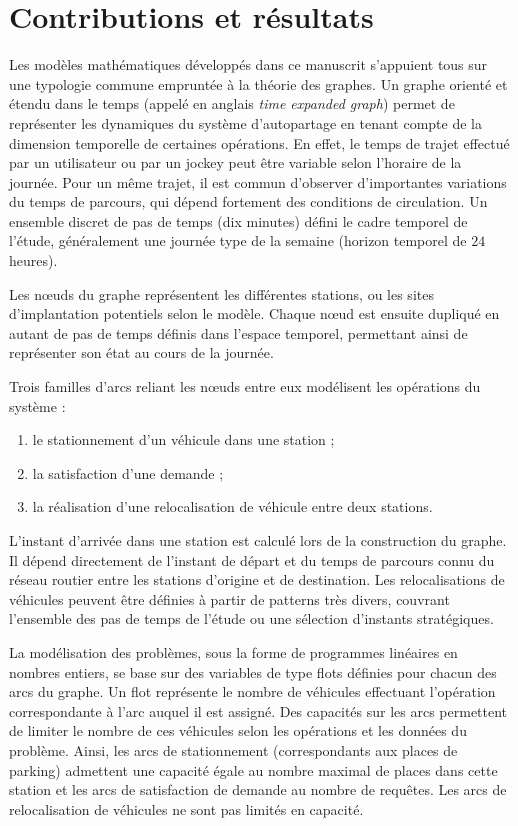 \newpage
\section*{Contributions et résultats}
Les modèles mathématiques développés dans ce manuscrit s'appuient tous sur une typologie commune empruntée à la théorie des graphes.
Un graphe orienté et étendu dans le temps (appelé en anglais \emph{time expanded graph}) permet de représenter les dynamiques du système d'autopartage en tenant compte de la dimension temporelle de certaines opérations.
En effet, le temps de trajet effectué par un utilisateur ou par un jockey peut être variable selon l'horaire de la journée.
Pour un même trajet, il est commun d'observer d'importantes variations du temps de parcours, qui dépend fortement des conditions de circulation.
Un ensemble discret de pas de temps (\eg dix minutes) défini le cadre temporel de l'étude, généralement une journée type de la semaine (horizon temporel de $24$ heures).

\medskip
Les nœuds du graphe représentent les différentes stations, ou les sites d'implantation potentiels selon le modèle.
Chaque nœud est ensuite dupliqué en autant de pas de temps définis dans l'espace temporel, permettant ainsi de représenter son état au cours de la journée.

Trois familles d'arcs reliant les nœuds entre eux modélisent les opérations du système :
\begin{enumerate}
\item le stationnement d'un véhicule dans une station ;
\item la satisfaction d'une demande ;
\item la réalisation d'une relocalisation de véhicule entre deux stations.
\end{enumerate}

\medskip
L'instant d'arrivée dans une station est calculé lors de la construction du graphe.
Il dépend directement de l'instant de départ et du temps de parcours connu du réseau routier entre les stations d'origine et de destination.
Les relocalisations de véhicules peuvent être définies à partir de patterns très divers, couvrant l'ensemble des pas de temps de l'étude ou une sélection d'instants stratégiques.

\medskip
La modélisation des problèmes, sous la forme de programmes linéaires en nombres entiers, se base sur des variables de type flots définies pour chacun des arcs du graphe.
Un flot représente le nombre de véhicules effectuant l'opération correspondante à l'arc auquel il est assigné.
Des capacités sur les arcs permettent de limiter le nombre de ces véhicules selon les opérations et les données du problème.
Ainsi, les arcs de stationnement (correspondants aux places de parking) admettent une capacité égale au nombre maximal de places  dans cette station et les arcs de satisfaction de demande au nombre de requêtes.
Les arcs de relocalisation de véhicules ne sont pas limités en capacité.

